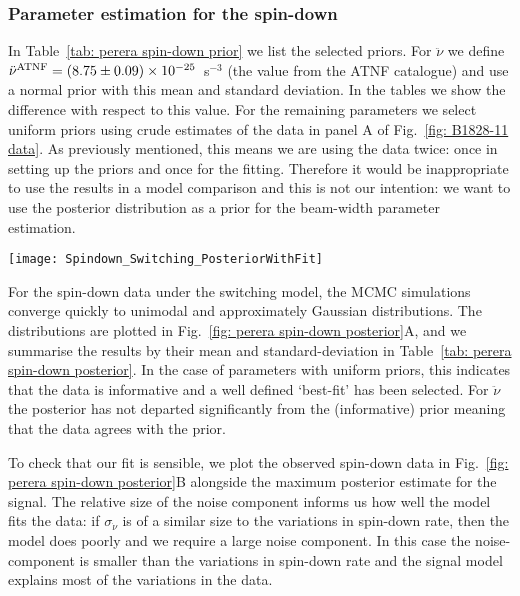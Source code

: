 \documentclass[../full_thesis/full_thesis.tex]{subfiles}
\newcommand{\thisdir}{../comparing_periodic_modulations}
\newcommand{\bigfigurecaptions}[2]{
$\textbf{A}$: The estimated marginal posterior probability distribution for the
#1 #2 model parameters. $\textbf{B}$: Checking the fit of the model using the
maximum posterior values to the data; see Fig.~\ref{fig: noise-only beam-width
posterior fit} for a complete description.}
\begin{document}
\subsubsection{Parameter estimation for the spin-down}

In Table~\ref{tab: perera spin-down prior} we list the selected priors. For
$\ddot{\nu}$ we define
$\ddot{\nu}^{\tiny\mathrm{ATNF}}=(8.75\pm0.09)\times10^{-25}$~s$^{-3}$ (the
value from the ATNF catalogue) and use a normal prior with this mean and
standard deviation. In the tables we show the difference with respect to this
value. For the remaining parameters we select uniform priors using
crude estimates of the data in panel A of Fig.~\ref{fig: B1828-11 data}.
As previously mentioned, this means we are using the
data twice: once in setting up the priors and once for the fitting. Therefore
it would be inappropriate to use the results in a model comparison and this is
not our intention: we want to use the posterior distribution as a prior for the
beam-width parameter estimation.
\begin{table}
\centering
\caption{Prior distributions for the spin-down switching model.}
\label{tab: perera spin-down prior}

\end{table}

\begin{figure*}
\centering
\texttt{[image: Spindown\_Switching\_PosteriorWithFit]}
\caption{\bigfigurecaptions{Switching}{spin-down}}
\label{fig: perera spin-down posterior}
\end{figure*}

For the spin-down data under the switching model, the MCMC simulations converge
quickly to unimodal and approximately Gaussian distributions. The distributions are plotted
in Fig.~\ref{fig: perera spin-down posterior}A, and we summarise the results by
their mean and standard-deviation in Table~\ref{tab: perera spin-down
posterior}. In the case of parameters with uniform priors, this indicates that the data
is informative and a well defined `best-fit' has been selected. For $\ddot{\nu}$
the posterior has not departed significantly from the (informative) prior meaning that the
data agrees with the prior.
\begin{table}
\centering
\caption{Posterior estimates for the spin-down switching model.}
\label{tab: perera spin-down posterior}

\end{table}

To check that our fit is sensible, we plot the observed spin-down data in
Fig.~\ref{fig: perera spin-down posterior}B alongside the maximum posterior
estimate for the signal. The relative size of the noise component informs us
how well the model fits the data: if $\sigma_{\dot{\nu}}$ is of a similar size
to the variations in spin-down rate, then the model does poorly and we require
a large noise component. In this case the noise-component is smaller than the
variations in spin-down rate and the signal model explains most of the
variations in the data.
\end{document}
